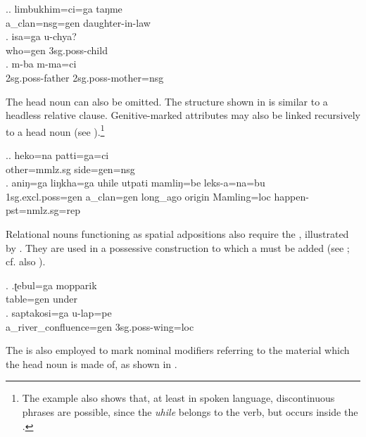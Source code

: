 		\ex.\ag. limbukhim=ci=ga       taŋme\\
		a\_clan{\sc =nsg=gen} daughter-in-law\\
 
	\bg. isa=ga u-chya?\\
	who{\sc =gen} {\sc 3sg.poss-}child\\
		\bg. m-ba m-ma=ci\\
		{\sc 2sg.poss-}father {\sc 2sg.poss-}mother{\sc =nsg}	\\
	
The head noun can also be omitted. The  structure shown in \Next[a] is similar to a headless relative clause. Genitive-marked attributes may also  be linked recursively to a head noun (see \Next[b]).\footnote{The example also shows that, at least in spoken language, discontinuous phrases are possible, since the  \emph{uhile} belongs to the verb, but occurs inside the .}



\ex.\ag. heko=na    patti=ga=ci\\
		other{\sc =mmlz.sg} side{\sc =gen=nsg}	\\
	 
	\bg. aniŋ=ga liŋkha=ga uhile utpati mamliŋ=be      leks-a=na=bu\\
		{\sc 1sg.excl.poss=gen} a\_clan{\sc =gen} long\_ago origin Mamling{\sc =loc} happen{\sc [3sg]-pst=nmlz.sg=rep}\\
		  

Relational nouns functioning as spatial adpositions also require the , illustrated by \Next . They are used in a possessive construction to which a  must be added (see \Next[b]; cf. also ). 
	
\ex. \ag.ʈebul=ga mopparik\\
			table{\sc =gen} under\\
	\bg. saptakosi=ga u-lap=pe\\
		a\_river\_confluence{\sc =gen} {\sc 3sg.poss-}wing{\sc =loc}\\
	   

The  is also employed to mark nominal modifiers referring to the material which the head noun is made of, as shown in \Next.

